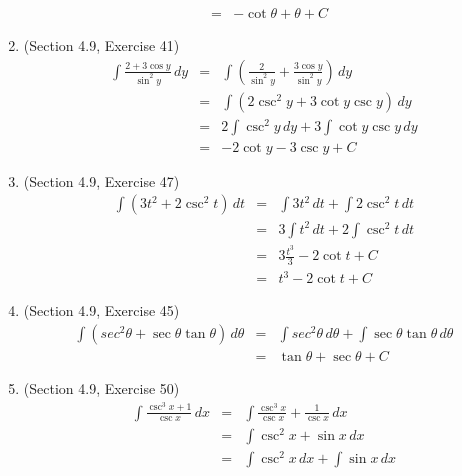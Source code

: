\documentclass{article}
\begin{document}
\begin{enumerate}
\begin{eqnarray}
                                                           &=& -\cot{\theta} + \theta + C
        \end{eqnarray}
    \item (Section 4.9, Exercise 41)
        \begin{eqnarray}
            \int{\frac{2 + 3\cos{y}}{\sin^2{y}}}\,dy &=& \int{\left(\frac{2}{\sin^2{y}} + \frac{3\cos{y}}{\sin^2{y}}\right)}\,dy \\
                                                     &=& \int{\left(2\csc^2{y} + 3\cot{y}\csc{y}\right)}\,dy \\
                                                     &=& 2\int{\csc^2{y}}\,dy + 3\int{\cot{y}\csc{y}}\,dy \\
                                                     &=& -2\cot{y} - 3\csc{y} + C
        \end{eqnarray}
    \item (Section 4.9, Exercise 47)
        \begin{eqnarray}
            \int{\left(3t^2 + 2\csc^2{t}\right)}\,dt &=& \int{3t^2}\,dt + \int{2\csc^2{t}}\,dt \\
                                                     &=& 3\int{t^2}\,dt + 2\int{\csc^2{t}}\,dt \\
                                                     &=& 3\frac{t^3}{3} - 2\cot{t} + C \\
                                                     &=& t^3 - 2\cot{t} + C
        \end{eqnarray}
    \item (Section 4.9, Exercise 45)
        \begin{eqnarray}
            \int{\left(sec^2{\theta} + \sec{\theta}\tan{\theta}\right)}\,d\theta &=& \int{sec^2{\theta}}\,d\theta + \int{\sec{\theta}\tan{\theta}}\,d\theta \\
                                                                                 &=& \tan{\theta} + \sec{\theta} + C
        \end{eqnarray}
    \item (Section 4.9, Exercise 50)
        \begin{eqnarray}
            \int{\frac{\csc^3{x} + 1}{\csc{x}}}\,dx &=& \int{\frac{\csc^3{x}}{\csc{x}} + \frac{1}{\csc{x}}}\,dx \\
                                                    &=& \int{\csc^2{x} + \sin{x}}\,dx \\
                                                    &=& \int{\csc^2{x}}\,dx + \int{\sin{x}}\,dx \\

\end{eqnarray}
\end{enumerate}
\end{document}
